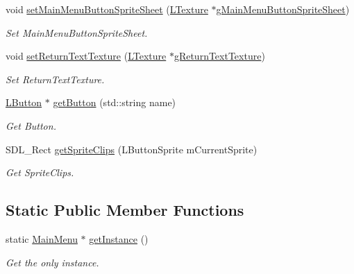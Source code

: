 \begin{DoxyCompactItemize}
\mbox{\label{class_main_menu_a20553747eafa509412c9d14b69d6aa6b}} 
void \mbox{\hyperlink{class_main_menu_a20553747eafa509412c9d14b69d6aa6b}{set\+Main\+Menu\+Button\+Sprite\+Sheet}} (\mbox{\hyperlink{class_l_texture}{L\+Texture}} $\ast$\mbox{\hyperlink{class_main_menu_a03d3833a633f336c028e88783900782d}{g\+Main\+Menu\+Button\+Sprite\+Sheet}})
\begin{DoxyCompactList}\small\item\em Set Main\+Menu\+Button\+Sprite\+Sheet. \end{DoxyCompactList}\item 
\mbox{\label{class_main_menu_ac29729f73e5db98765b573fea34d3ad7}} 
void \mbox{\hyperlink{class_main_menu_ac29729f73e5db98765b573fea34d3ad7}{set\+Return\+Text\+Texture}} (\mbox{\hyperlink{class_l_texture}{L\+Texture}} $\ast$\mbox{\hyperlink{class_main_menu_a5e9fea95a73ddc6ff72a18cf99d2d60a}{g\+Return\+Text\+Texture}})
\begin{DoxyCompactList}\small\item\em Set Return\+Text\+Texture. \end{DoxyCompactList}\item 
\mbox{\label{class_main_menu_a98d83be18ea313451093001f87841e56}} 
\mbox{\hyperlink{class_l_button}{L\+Button}} $\ast$ \mbox{\hyperlink{class_main_menu_a98d83be18ea313451093001f87841e56}{get\+Button}} (std\+::string name)
\begin{DoxyCompactList}\small\item\em Get Button. \end{DoxyCompactList}\item 
\mbox{\label{class_main_menu_a469581ce8c81585302222b9109b3b687}} 
S\+D\+L\+\_\+\+Rect \mbox{\hyperlink{class_main_menu_a469581ce8c81585302222b9109b3b687}{get\+Sprite\+Clips}} (L\+Button\+Sprite m\+Current\+Sprite)
\begin{DoxyCompactList}\small\item\em Get Sprite\+Clips. \end{DoxyCompactList}\end{DoxyCompactItemize}
\subsection*{Static Public Member Functions}
\begin{DoxyCompactItemize}
\item 
\mbox{\label{class_main_menu_a543f0a126e2cc6c385ed3757e4b3c825}} 
static \mbox{\hyperlink{class_main_menu}{Main\+Menu}} $\ast$ \mbox{\hyperlink{class_main_menu_a543f0a126e2cc6c385ed3757e4b3c825}{get\+Instance}} ()
\begin{DoxyCompactList}\small\item\em Get the only instance. \end{DoxyCompactList}\end{DoxyCompactItemize}

